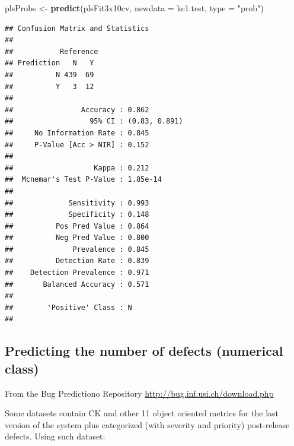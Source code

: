 \documentclass[]{book}
\newenvironment{Shaded}{\begin{snugshade}}{\end{snugshade}}
\newcommand{\KeywordTok}[1]{\textcolor[rgb]{0.13,0.29,0.53}{\textbf{{#1}}}}
\newcommand{\DataTypeTok}[1]{\textcolor[rgb]{0.13,0.29,0.53}{{#1}}}
\newcommand{\StringTok}[1]{\textcolor[rgb]{0.31,0.60,0.02}{{#1}}}
\newcommand{\NormalTok}[1]{{#1}}
\begin{document}
\begin{Shaded}
\begin{Highlighting}[]
\NormalTok{plsProbs <-}\StringTok{ }\KeywordTok{predict}\NormalTok{(plsFit3x10cv, }\DataTypeTok{newdata =} \NormalTok{kc1.test, }\DataTypeTok{type =} \StringTok{"prob"}\NormalTok{)}
\end{Highlighting}
\end{Shaded}

\begin{Shaded}
\end{Shaded}

\begin{verbatim}
## Confusion Matrix and Statistics
## 
##           Reference
## Prediction   N   Y
##          N 439  69
##          Y   3  12
##                                        
##                Accuracy : 0.862        
##                  95% CI : (0.83, 0.891)
##     No Information Rate : 0.845        
##     P-Value [Acc > NIR] : 0.152        
##                                        
##                   Kappa : 0.212        
##  Mcnemar's Test P-Value : 1.85e-14     
##                                        
##             Sensitivity : 0.993        
##             Specificity : 0.148        
##          Pos Pred Value : 0.864        
##          Neg Pred Value : 0.800        
##              Prevalence : 0.845        
##          Detection Rate : 0.839        
##    Detection Prevalence : 0.971        
##       Balanced Accuracy : 0.571        
##                                        
##        'Positive' Class : N            
## 
\end{verbatim}

\subsection{Predicting the number of defects (numerical
class)}\label{predicting-the-number-of-defects-numerical-class}

From the Bug Predictiono Repository
\url{http://bug.inf.usi.ch/download.php}

Some datasets contain CK and other 11 object oriented metrics for the
last version of the system plus categorized (with severity and priority)
post-release defects. Using such dataset:
\end{document}
